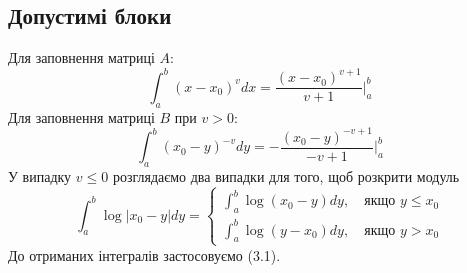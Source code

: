 \documentclass[12pt]{report}
\begin{document}
	\subsection{Допустимі блоки}
	 Для заповнення матриці $A$:
	$$\int_{a}^{b}(x-x_0)^vdx=\frac{(x-x_0)^{v+1}}{v+1}\Bigg|_a^b$$
	 Для заповнення матриці $B$ при $v>0$:
	$$\int_{a}^{b}(x_0-y)^{-v}dy=-\frac{(x_0-y)^{-v+1}}{-v+1}\Bigg|_a^b$$
	 У випадку $v\le0$ розглядаємо два випадки для того, щоб розкрити модуль
	\begin{equation*}
	\int_a^b\log|x_0-y|dy =\begin{cases}
	\int_{a}^{b}\log(x_0-y)dy,\quad\text{якщо $y\le x_0$}\\
	\int_{a}^{b}\log(y-x_0)dy,\quad\text{якщо $y>x_0$}
	\end{cases}
	\end{equation*}
	До отриманих інтегралів застосовуємо (3.1).
\end{document}
